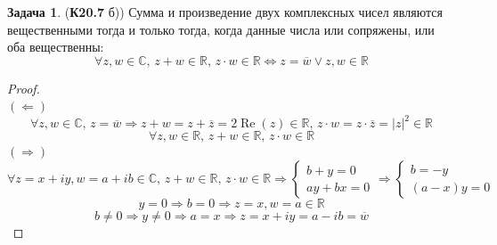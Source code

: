 \documentclass[12pt]{article}
\newcommand{\MR}{\mathbb{R}}
\newcommand{\MC}{\mathbb{C}}
\theoremstyle{definition}
\newtheorem{problem}{Задача}
\newcommand{\ovl}[1]{\overline{#1}}
\DeclareMathOperator{\RE}{\operatorname{Re}}
\begin{document}
\begin{problem}(\textbf{К20.7} б))
	Сумма и произведение двух комплексных чисел являются вещественными тогда и только тогда, когда данные числа или сопряжены, или оба вещественны:
	$$
		\forall z,w \in \MC, \, z + w \in \MR, \, z{\cdot}w \in \MR \Leftrightarrow z = \ovl{w} \vee z, w \in \MR
	$$
\end{problem}
\begin{proof}\hfill\\
	$(\Leftarrow)$
	$$
		\forall z,w \in \MC, \, z = \ovl{w} \Rightarrow z + w = z + \ovl{z} = 2\RE(z) \in \MR,\, z{\cdot}w = z{\cdot}\ovl{z} = |z|^2 \in \MR 
	$$
	$$
		\forall z, w \in \MR, \, z + w \in \MR, \, z{\cdot}w \in \MR
	$$
	$(\Rightarrow)$
	$$
		\forall z = x + iy,w = a + ib \in \MC, \, z + w \in \MR, \, z{\cdot}w \in \MR \Rightarrow 
		\begin{cases}
			b + y = 0\\
			ay + bx = 0 
		\end{cases} \Rightarrow
			\begin{cases}
				b = -y \\
				(a -x)y = 0 
			\end{cases}
	$$
	$$
		y =0 \Rightarrow b = 0 \Rightarrow z =x, w = a \in \MR
	$$
	$$
		b \neq 0 \Rightarrow y \neq 0 \Rightarrow  a = x \Rightarrow z = x + iy = a - ib = \ovl{w}
	$$
\end{proof}
\end{document}
